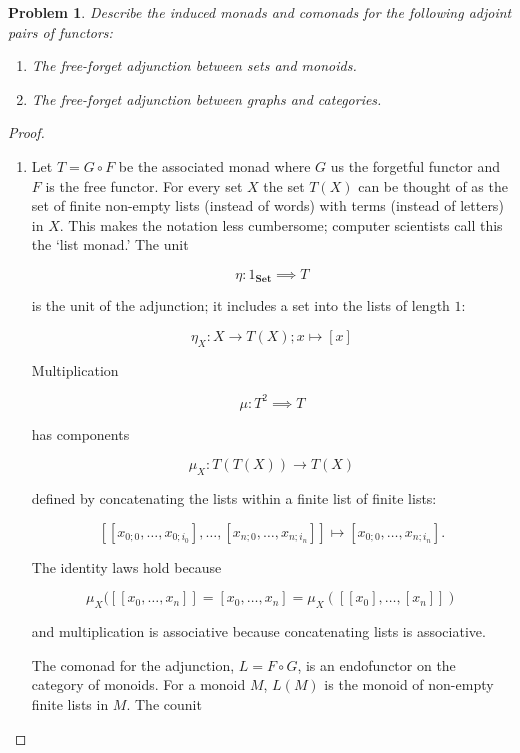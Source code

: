 \documentclass[11pt]{amsart}
\theoremstyle{plain}
\newtheorem{prob}[thm]{Problem}
\theoremstyle{definition}
\newcommand{\Set}{{\mathbf{Set}}}
\newcommand{\noi}{{\noindent}}
\begin{document}
    \begin{prob}
    Describe the induced monads and comonads for the following adjoint pairs of functors: 

    \begin{enumerate}
    \item[$(i)$] The free-forget adjunction between sets and monoids.
    \item[$(ii)$] The free-forget adjunction between graphs and categories.
    \end{enumerate}
    \end{prob}
    \begin{proof}
        \begin{enumerate}
        \item[$(i)$] Let $T = G \circ F$ be the associated monad where $G$ us the forgetful functor and $F$ is the free functor. For every set $X$ the set $T(X)$ can be thought of as the set of finite non-empty lists (instead of words) with terms (instead of letters) in $X$. This makes the notation less cumbersome; computer scientists call this the `list monad.' The unit
        
        \[ \eta : 1_{\Set} \implies T \]

        \noi is the unit of the adjunction; it includes a set into the lists of length $1$: 

        \[ \eta_X : X \to T(X) ; x \mapsto [x]\]

        \noi Multiplication 
        
        \[ \mu : T^2 \implies T \]

        \noi has components 

        \[ \mu_X : T(T(X)) \to T(X) \]

        \noi defined by concatenating the lists within a finite list of finite lists: 

        \[ [ [x_{0 ; 0}, \dots , x_{0 ; i_0}], \dots , [x_{n;0} , \dots , x_{n ; i_n}] ] \mapsto  [ x_{0;0}, \dots,  x_{n;i_n}] . \]

        \noi The identity laws hold because 

        \[ \mu_X ([[x_0, \dots, x_n]] = [x_0, \dots, x_n] = \mu_X ([[x_0], \dots, [x_n]] )\]

        \noi and multiplication is associative because concatenating lists is associative. \medskip 

        \noi The comonad for the adjunction, $L = F \circ G$, is an endofunctor on the category of monoids. For a monoid $M$, $L(M)$ is the monoid of non-empty finite lists in $M$. The counit


\end{enumerate}
\end{proof}
\end{document}

